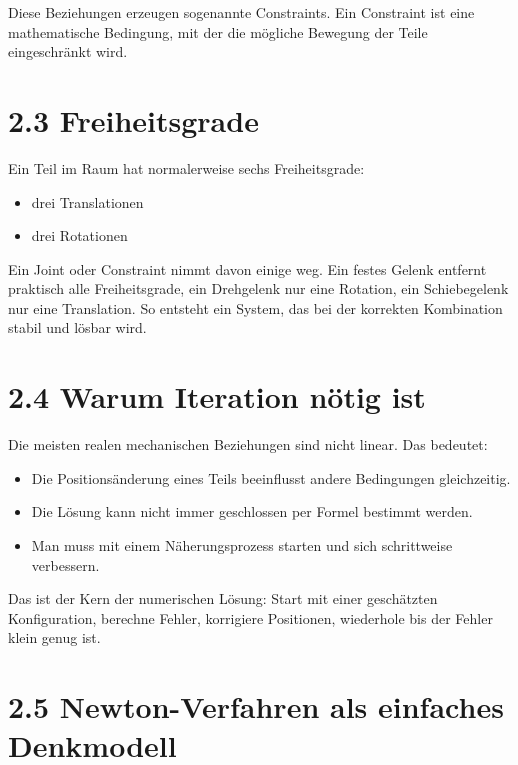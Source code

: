 \documentclass[
  12pt
]{book}
\providecommand{\tightlist}{%
  \setlength{\itemsep}{0pt}\setlength{\parskip}{0pt}}
\begin{document}
Diese Beziehungen erzeugen sogenannte Constraints. Ein Constraint ist
eine mathematische Bedingung, mit der die mögliche Bewegung der Teile
eingeschränkt wird.

\hypertarget{freiheitsgrade}{%
\section{\texorpdfstring{{2.3}
Freiheitsgrade}{2.3 Freiheitsgrade}}\label{freiheitsgrade}}

Ein Teil im Raum hat normalerweise sechs Freiheitsgrade:

\begin{itemize}
\tightlist
\item
  drei Translationen
\item
  drei Rotationen
\end{itemize}

Ein Joint oder Constraint nimmt davon einige weg. Ein festes Gelenk
entfernt praktisch alle Freiheitsgrade, ein Drehgelenk nur eine
Rotation, ein Schiebegelenk nur eine Translation. So entsteht ein
System, das bei der korrekten Kombination stabil und lösbar wird.

\hypertarget{warum-iteration-nuxf6tig-ist}{%
\section{\texorpdfstring{{2.4} Warum Iteration nötig
ist}{2.4 Warum Iteration nötig ist}}\label{warum-iteration-nuxf6tig-ist}}

Die meisten realen mechanischen Beziehungen sind nicht linear. Das
bedeutet:

\begin{itemize}
\tightlist
\item
  Die Positionsänderung eines Teils beeinflusst andere Bedingungen
  gleichzeitig.
\item
  Die Lösung kann nicht immer geschlossen per Formel bestimmt werden.
\item
  Man muss mit einem Näherungsprozess starten und sich schrittweise
  verbessern.
\end{itemize}

Das ist der Kern der numerischen Lösung: Start mit einer geschätzten
Konfiguration, berechne Fehler, korrigiere Positionen, wiederhole bis
der Fehler klein genug ist.

\hypertarget{newton-verfahren-als-einfaches-denkmodell}{%
\section{\texorpdfstring{{2.5} Newton-Verfahren als einfaches
Denkmodell}{2.5 Newton-Verfahren als einfaches Denkmodell}}\label{newton-verfahren-als-einfaches-denkmodell}}
\end{document}
